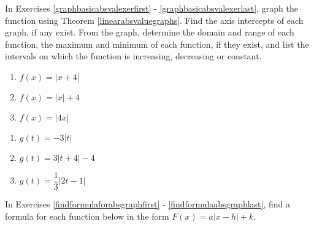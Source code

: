 \documentclass{ximera}
\begin{document}
	\author{Stitz-Zeager}


In Exercises \ref{graphbasicabsvalexerfirst} - \ref{graphbasicabsvalexerlast}, graph the function using Theorem \ref{linearabsvaluegraphs}. Find the axis intercepts of each graph, if any exist.  From the graph, determine the domain and range of each function, the maximum and minimum of each function, if they exist, and list the intervals on which the function is increasing, decreasing or constant.

\begin{multicols}{3}
\begin{enumerate}

\item $f(x) = |x + 4|$ \label{graphbasicabsvalexerfirst}
\item $f(x) = |x| + 4$
\item $f(x) = |4x|$


\setcounter{HW}{\value{enumi}}
\end{enumerate}
\end{multicols}

\begin{multicols}{3}
\begin{enumerate}
\setcounter{enumi}{\value{HW}}

\item $g(t) = -3|t|$ 
\item $g(t) = 3|t + 4| - 4$ 
\item $g(t) = \dfrac{1}{3}|2t - 1|$ \label{graphbasicabsvalexerlast}

\setcounter{HW}{\value{enumi}}
\end{enumerate}
\end{multicols}


In Exercises \ref{findformulaforabsgraphfirst} - \ref{findformulaabsgraphlast}, find a formula for each function below in the form $F(x) = a|x-h|+k$.
\end{document}
